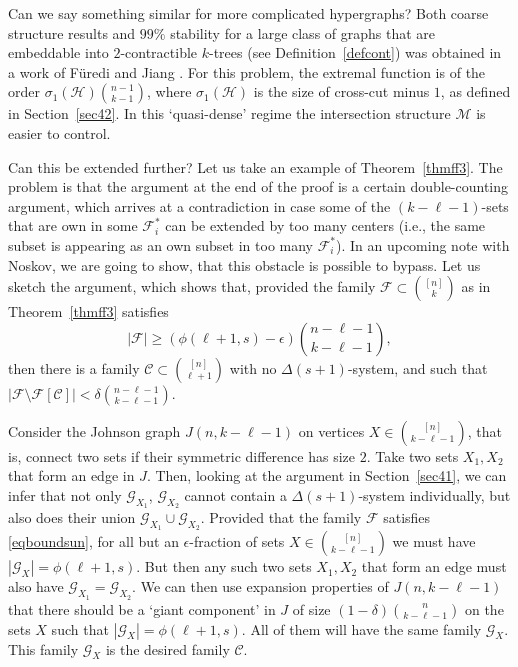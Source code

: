 \documentclass[graybox]{svmult}
\renewcommand{\ge}{\geqslant}
\newcommand{\ff}{\mathcal{F}}
\newcommand{\m}{\mathcal}
\begin{document}
Can we say something similar for more complicated hypergraphs? Both coarse structure results and $99\%$ stability for a large class of graphs that are embeddable into $2$-contractible $k$-trees (see Definition~\ref{defcont}) was obtained in a work of F\"uredi and Jiang \cite[Theorem~4.2]{FJ15}. For this problem, the extremal function is of the order $\sigma_1(\m H){n-1\choose k-1}$, where $\sigma_1(\m H)$ is the size of cross-cut minus $1$, as defined in Section~\ref{sec42}. In this `quasi-dense' regime the intersection structure $\m M$ is easier to control.

Can this be extended further? Let us take an example of Theorem~\ref{thmff3}. The problem is that the argument at the end of the proof is a certain double-counting argument, which arrives at a contradiction in case some of the $(k-\ell-1)$-sets  that are own in some $\ff_i^*$ can be extended by too many centers (i.e., the same subset is appearing as an own subset in too many $\ff_i^*$). In an upcoming note with Noskov, we are going to show, that this obstacle is possible to bypass. Let us sketch the argument, which shows that, provided the family  $\ff\subset{[n]\choose k}$ as in Theorem~\ref{thmff3} satisfies \begin{equation}\label{eqboundsun} |\ff|\ge (\phi(\ell+1,s)-\epsilon){n-\ell-1\choose k-\ell-1},\end{equation} then there is a family $\m C\subset {[n]\choose \ell+1}$ with no $\Delta(s+1)$-system, and such that $|\ff\setminus \ff[\m C]|<\delta{n-\ell-1\choose k-\ell-1}$.

Consider the Johnson graph $J(n,k-\ell-1)$ on vertices $X\in {[n]\choose k-\ell-1}$, that is, connect two sets if their symmetric difference has size $2$. Take two sets $X_1,X_2$ that form an edge in $J$. Then, looking at the argument in Section~\ref{sec41}, we can infer that not only $\m G_{X_1}$, $\m G_{X_2}$ cannot contain a $\Delta(s+1)$-system individually, but also does their union $\m G_{X_1}\cup \m G_{X_2}.$ Provided that the family $\ff$ satisfies \eqref{eqboundsun}, for all but an $\epsilon$-fraction of sets $X\in {[n]\choose k-\ell-1}$ we must have $|\m G_{X}| = \phi(\ell+1,s)$. But then any such two sets $X_1, X_2$ that form an edge must also have $\m G_{X_1}= \m G_{X_2}.$ We can then use expansion properties of $J(n,k-\ell-1)$ that there should be a `giant component' in $J$ of size $(1-\delta){n\choose k-\ell-1}$ on the sets $X$ such that $|\m G_X| = \phi(\ell+1,s)$. All of them will have the same family $\m G_X$. This family $\m G_X$ is the desired family $\m C$.
\end{document}
